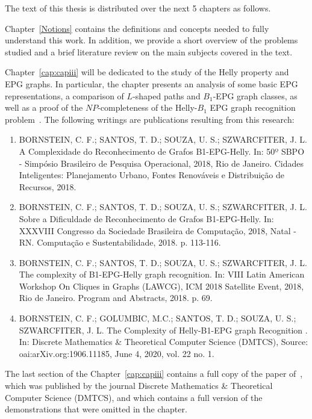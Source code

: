 The text of this thesis is distributed over the next 5 chapters as follows.


Chapter~\ref{Notions} contains the definitions and concepts needed to fully understand this work.  In addition, we provide a short overview of the problems studied and a brief literature review on the main subjects covered in the text.

Chapter~\ref{cap:capiii} will be dedicated to the study of the Helly property and EPG graphs. In particular, the chapter presents an analysis of some basic EPG representations, a comparison of $L$-shaped paths and $B_1$-EPG graph classes, as well as a proof of the $NP$-completeness of the Helly-$B_1$ EPG  graph recognition problem~\cite{dmtcs:6506}. The following writings are publications resulting from this research:

\begin{enumerate}
    \item BORNSTEIN, C. F.; SANTOS, T. D.; SOUZA, U. S.; SZWARCFITER, J. L. A Complexidade do Reconhecimento de Grafos B1-EPG-Helly. In: 50º SBPO - Simpósio Brasileiro de Pesquisa Operacional, 2018, Rio de Janeiro. Cidades Inteligentes: Planejamento Urbano, Fontes Renováveis e Distribuição de Recursos, 2018.

     \item BORNSTEIN, C. F.; SANTOS, T. D.; SOUZA, U. S.; SZWARCFITER, J. L. Sobre a Dificuldade de Reconhecimento de Grafos B1-EPG-Helly. In: XXXVIII Congresso da Sociedade Brasileira de Computação, 2018, Natal - RN. Computação e Sustentabilidade, 2018. p. 113-116.

     
     \item BORNSTEIN, C. F.; SANTOS, T. D.; SOUZA, U. S.; SZWARCFITER, J. L. The complexity of B1-EPG-Helly graph recognition. In: VIII Latin American Workshop On Cliques in Graphs (LAWCG), ICM 2018 Satellite Event, 2018, Rio de Janeiro. Program and Abstracts, 2018. p. 69.

     
     \item BORNSTEIN, C. F.; GOLUMBIC, M.C.; SANTOS, T. D.; SOUZA, U. S.; SZWARCFITER, J. L.  The Complexity of Helly-B1-EPG graph Recognition . In: Discrete Mathematics \& Theoretical Computer Science (DMTCS), Source: oai:arXiv.org:1906.11185, June 4, 2020,  vol. 22 no. 1. 
\end{enumerate}

The last section of the Chapter~\ref{cap:capiii} contains a full copy of the paper of~\citet{dmtcs:6506}, which was published by the journal Discrete Mathematics \& Theoretical Computer Science (DMTCS), and which contains a full version of the demonstrations that were omitted in the chapter.


